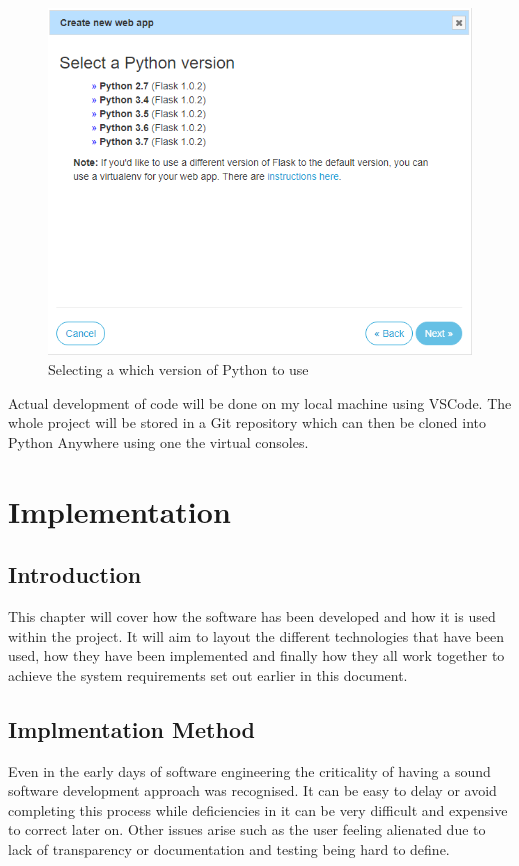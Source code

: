 \documentclass[10pt,a4paper]{article}
\begin{document}
\begin{figure}[H]
\centering
  \includegraphics[width=\linewidth]{images/webapppython.png}
  \caption{Selecting a which version of Python to use}
  \label{fig:webapppython}
\end{figure}

Actual development of code will be done on my local machine using VSCode. The whole project will be stored in a Git repository which can then be cloned into Python Anywhere using one the virtual consoles. 

\pagebreak
\section{Implementation} 
\subsection{Introduction}
This chapter will cover how the software has been developed and how it is used within the project. It will aim to layout the different technologies that have been used, how they have been implemented and finally how they all work together to achieve the system requirements set out earlier in this document.

\subsection{Implmentation Method}
Even in the early days of software engineering the criticality of having a sound software development approach was recognised. It can be easy to delay or avoid completing this process while deficiencies in it can be very difficult and expensive to correct later on. Other issues arise such as the user feeling alienated due to lack of transparency or documentation and testing being hard to define\citep{1674590}.
\end{document}
